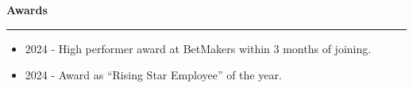 \documentclass[11pt, letterpaper]{article}
\newcommand{\cvsection}[1]{
	\vspace{0.5em}
	\noindent\textbf{#1}\\[-0.5em] 
	\rule{\textwidth}{0.5pt}
	\vspace{0.5em}
}
\begin{document}
\cvsection{Awards}
\vspace{-2em}
\begin{itemize}
    \setlength\itemsep{-0.2em}
    \setlength\leftskip{-2em}
    \setlength{}
    \setlength\itemindent{0em}  
 	\item \scriptsize 2024 - High performer award at BetMakers within 3 months of joining.
 	\item \scriptsize 2024 - Award as “Rising Star Employee” of the year.
\end{itemize}
\vspace{0.5em}
\end{document}
